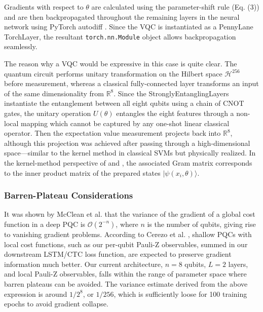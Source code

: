 \documentclass{ieeeaccess}
\begin{document}
Gradients with respect to $\theta$ are calculated using the parameter-shift rule (Eq. (3)) and are then backpropagated throughout the remaining layers in the neural network using PyTorch autodiff \cite{b34}. Since the VQC is instantiated as a PennyLane TorchLayer, the resultant \texttt{torch.nn.Module} object allows backpropagation seamlessly.

The reason why a VQC would be expressive in this case is quite clear. The quantum circuit performs unitary transformation on the Hilbert space $\mathcal{H}^{256}$ before measurement, whereas a classical fully-connected layer transforms an input of the same dimensionality from $\mathbb{R}^8$. Since the StronglyEntanglingLayers instantiate the entanglement between all eight qubits using a chain of CNOT gates, the unitary operation $U(\theta)$ entangles the eight features through a non-local mapping which cannot be captured by any one-shot linear classical operator. Then the expectation value measurement projects back into $\mathbb{R}^8$, although this projection was achieved after passing through a high-dimensional space---similar to the kernel method in classical SVMs but physically realized. In the kernel-method perspective of \cite{b5} and \cite{b35}, the associated Gram matrix corresponds to the inner product matrix of the prepared states $|\psi(x_i, \theta)\rangle$.

\subsubsection{Barren-Plateau Considerations}
It was shown by McClean et al. \cite{b4} that the variance of the gradient of a global cost function in a deep PQC is $\mathcal{O}(2^{-n})$, where $n$ is the number of qubits, giving rise to vanishing gradient problems. According to Cerezo et al. \cite{b38}, shallow PQCs with local cost functions, such as our per-qubit Pauli-Z observables, summed in our downstream LSTM/CTC loss function, are expected to preserve gradient information much better. Our current architecture, $n = 8$ qubits, $L = 2$ layers, and local Pauli-Z observables, falls within the range of parameter space where barren plateaus can be avoided. The variance estimate derived from the above expression is around $1/2^8$, or $1/256$, which is sufficiently loose for 100 training epochs to avoid gradient collapse.
\end{document}
